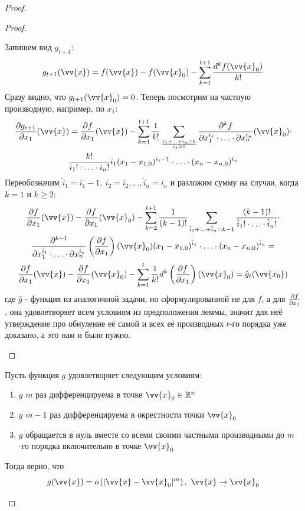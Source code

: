 \begin{proof}
\begin{proof}
\begin{itemize}
			Запишем вид $g_{t + 1}$:
			\[
				g_{t + 1}(\vv{x}) = f(\vv{x}) - f(\vv{x}_0) - \suml_{k = 1}^{t + 1} \frac{d^k f(\vv{x}_0)}{k!}
			\]
			Сразу видно, что $g_{t + 1} (\vv{x}_0) = 0$. Теперь посмотрим на частную производную, например, по $x_1$:
			\begin{multline*}
				\pd{g_{t + 1}}{x_1} (\vv{x}) = \pd{f}{x_1} (\vv{x}) - \suml_{k = 1}^{t + 1} \frac{1}{k!} \suml_{i_1 + \ldots + i_n = k \over i_1 \ge 1} \frac{\vdelta^k f}{\vdelta x_1^{i_1} \cdot \ldots \cdot \vdelta x_n^{i_n}} (\vv{x}_0) \cdot
				\\
				\frac{k!}{i_1! \cdot \ldots \cdot i_n!} i_1 (x_1 - x_{1, 0})^{i_1 - 1} \cdot \ldots \cdot (x_n - x_{n, 0})^{i_n}
			\end{multline*}
			Переобозначим $\hat{i}_1 = i_1 - 1,\ \hat{i}_2 = i_2,\ldots, \hat{i}_n = i_n$ и разложим сумму на случаи, когда $k = 1$ и $k \ge 2$:
			\begin{multline*}
				\pd{f}{x_1} (\vv{x}) - \pd{f}{x_1} (\vv{x}_0) - \suml_{k = 2}^{t + 1} \frac{1}{(k - 1)!} \suml_{\hat{i}_1 + \ldots + \hat{i}_n = k - 1} \frac{(k - 1)!}{\hat{i}_1! \cdot \ldots \cdot \hat{i}_n!} \cdot
				\\
				\frac{\vdelta^{k - 1}}{\vdelta x_1^{\hat{i}_1} \cdot \ldots \cdot \vdelta x_n^{\hat{i}_n}} \left(\pd{f}{x_1}\right) (\vv{x}_0) (x_1 - x_{1, 0})^{\hat{i}_1} \cdot \ldots \cdot (x_n - x_{n, 0})^{\hat{i}_n} =
				\\
				\pd{f}{x_1} (\vv{x}) - \pd{f}{x_1} (\vv{x}_0) - \suml_{k = 1}^t \frac{1}{k!} d^k \left(\pd{f}{x_1}\right) (\vv{x}_0) = \hat{g}_t(\vv{x_0})
			\end{multline*}
			где $\hat{g}$ - функция из аналогичной задачи, но сформулированной не для $f$, а для $\frac{\partial f}{\partial x_1}$, она удовлетворяет всем условиям из предположения леммы, значит для неё утверждение про обнуление её самой и всех её производных $t$-го порядка уже доказано, а это нам и было нужно.
		\end{itemize}
	\end{proof}
	\begin{lemma}
		Пусть функция $g$ удовлетворяет следующим условиям:
		\begin{enumerate}
			\item $g$ $m$ раз дифференцируема в точке $\vv{x}_0 \in \R^n$
			
			\item $g$ $m - 1$ раз дифференцируема в окрестности точки $\vv{x}_0$
			
			\item $g$ обращается в нуль вместе со всеми своими частными производными до $m$-го порядка включительно в точке $\vv{x}_0$
		\end{enumerate}
		Тогда верно, что
		\[
			g(\vv{x}) = o\left(|\vv{x} - \vv{x}_0|^m\right),\ \vv{x} \to \vv{x}_0
		\]
	\end{lemma}
	

\end{proof}
